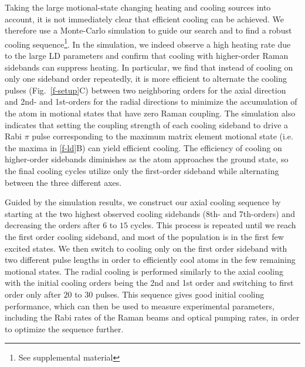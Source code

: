 \documentclass[aps,prl,twocolumn,groupedaddress]{revtex4-1}
\begin{document}
Taking the large motional-state changing heating and cooling sources into account,
it is not immediately clear that efficient cooling can be achieved.
We therefore use a Monte-Carlo simulation to guide our search and
to find a robust cooling sequence\footnote{See supplemental material}.
In the simulation, we indeed observe a high heating rate due to the large LD parameters
and confirm that cooling with higher-order Raman sidebands can suppress heating.
In particular, we find that instead of cooling on only one sideband order repeatedly,
it is more efficient to alternate the cooling pulses (Fig.~\ref{f-setup}C) between two
neighboring orders for the axial direction and 2nd- and 1st-orders for the radial directions
to minimize the accumulation of the atom in motional states that have zero Raman coupling.
The simulation also indicates that setting the coupling strength of each cooling sideband
to drive a Rabi $\pi$ pulse corresponding to the maximum matrix element motional state
(i.e. the maxima in \ref{f-ld}B) can yield efficient cooling.
The efficiency of cooling on higher-order sidebands diminishes
as the atom approaches the ground state, so the final cooling cycles utilize only the first-order sideband while alternating between the three different axes.

Guided by the simulation results,
we construct our axial cooling sequence by starting at the two highest
observed cooling sidebands (8th- and 7th-orders)
and decreasing the orders after $6$ to $15$ cycles.
This process is repeated until we reach the first order cooling sideband, and most of the
population is in the first few excited states.  We then switch to cooling only on the
first order sideband with two different pulse lengths in order to efficiently cool atoms in the
few remaining motional states.
The radial cooling is performed similarly to the axial cooling with the initial cooling orders being
the 2nd and 1st order and switching to first order only after $20$ to $30$ pulses.
This sequence gives good initial cooling performance, which can then be used to measure experimental
parameters, including the Rabi rates of the Raman beams and optical pumping rates,
in order to optimize the sequence further.
\end{document}
